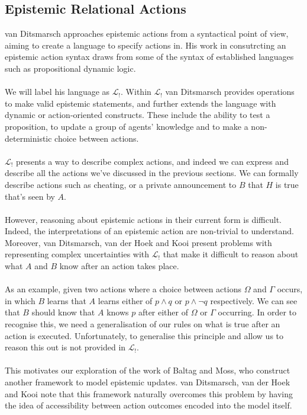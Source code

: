 \documentclass[12pt, a4paper, twoside]{article}
\begin{document}
\subsection{Epistemic Relational Actions} \label{epi_acts}
van Ditsmarsch approaches epistemic actions from a syntactical point of view,
aiming to create a language to specify actions in.
His work in consutrcting an epistemic action syntax draws from some of the
syntax of established languages such as propositional dynamic logic.\\
\\
We will label his language as $\mathcal{L}_{!}$.
Within $\mathcal{L}_{!}$ van Ditsmarsch provides operations to make valid
epistemic statements, and further extends the language with dynamic or
action-oriented constructs.
These include the ability to test a proposition, to update a group of agents'
knowledge and to make a non-deterministic choice between actions.\\
\\
$\mathcal{L}_{!}$ presents a way to describe complex actions, and indeed we can
express and describe all the actions we've discussed in the previous sections.
We can formally describe actions such as cheating, or a private
announcement to $B$ that $H$ is true that's seen by $A$.\\
\\
However, reasoning about epistemic actions in their current form is difficult.
Indeed, the interpretations of an epistemic action are non-trivial to
understand.
Moreover, van Ditsmarsch, van der Hoek and Kooi present problems with
representing complex uncertainties with $\mathcal{L}_{!}$ that make it difficult
to reason about what $A$ and $B$ know after an action takes place.\\
\\
As an example, given two actions where a choice between actions $\Omega$ and
$\Gamma$ occurs, in which $B$ learns that $A$ learns either of $p \land q$ or
$p \land \neg q$ respectively.
We can see that $B$ should know that $A$ knows $p$ after either of $\Omega$ or
$\Gamma$ occurring.
In order to recognise this, we need a generalisation of our rules on what is
true after an action is executed.
Unfortunately, to generalise this principle and allow us to reason this out is
not provided in $\mathcal{L}_{!}$.\\
\\
This motivates our exploration of the work of Baltag and Moss, who construct
another framework to model epistemic updates.
van Ditsmarsch, van der Hoek and Kooi note that this framework naturally
overcomes this problem by having the idea of accessibility between action
outcomes encoded into the model itself.
\end{document}
